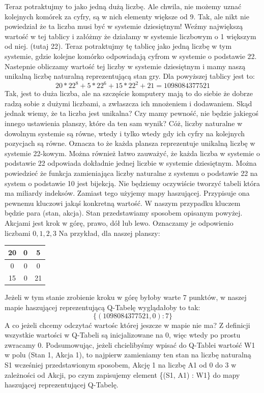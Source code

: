 \documentclass[a4paper,12pt]{article}
\begin{document}
Teraz potraktujmy to jako jedną dużą liczbę. Ale chwila, nie możemy uznać kolejnych komórek za cyfry, są w nich elementy większe od 9. Tak, ale nikt nie powiedział że ta liczba musi być w systemie dziesiętnym! Weźmy największą wartość w tej tablicy i załóżmy że działamy w systemie liczbowym o 1 większym od niej. (tutaj 22). Teraz potraktujmy tę tablicę jako jedną liczbę w tym systemie, gdzie kolejne komórko odpowiadają cyfrom w systemie o podstawie 22. Nastepnie obliczamy wartość tej liczby w systemie dziesiętnym i mamy naszą unikalną liczbę naturalną reprezentującą stan gry. Dla powyższej tablicy jest to:
\[20*22^8 + 5*22^6 + 15*22^2 + 21 = 1098084377521\]
Tak, jest to duża liczba, ale na szczęście komputery mają to do siebie że dobrze radzą sobie z dużymi liczbami, a zwłaszcza ich mnożeniem i dodawaniem.
\newline \newline Skąd jednak wiemy, że ta liczba jest unikalna? Czy mamy pewność, nie będzie jakiegoś innego ustawienia planszy, które da ten sam wynik? Cóż, liczby naturalne w dowolnym systemie są równe, wtedy i tylko wtedy gdy ich cyfry na kolejnych pozycjach są równe. Oznacza to że każda plansza reprezentuje unikalną liczbę w systemie 22-kowym. Można również łatwo zauważyć, że każda liczba w systemie o podstawie 22 odpowiada dokładnie jednej liczbie w systemie dziesiętnym. Można powiedzieć że funkcja zamieniająca liczby naturalne z systemu o podstawie 22 na system o podstawie 10 jest bijekcją.
\newline \newline Nie będziemy oczywiście tworzyć tabeli która ma miliardy indeksów. Zamiast tego użyjemy mapy haszującej. Przypisuje ona pewnemu kluczowi jakąś konkretną wartość. W naszym przypadku kluczem będzie para (stan, akcja). Stan przedstawiamy sposobem opisanym powyżej. Akcjami jest krok w górę, prawo, dół lub lewo. Oznaczamy je odpowienio liczbami \(0, 1, 2, 3\)
Na przykład, dla naszej planszy:
\begin{center}
\begin{tabular}{ |c|c|c| }
\hline
20 & 0 & 5 \\
\hline
0 & 0 & 0 \\
\hline
15 & 0 & 21 \\
\hline
\end{tabular}
\end{center} 
Jeżeli w tym stanie zrobienie kroku w górę byłoby warte 7 punktów, w naszej mapie haszującej reprezentującą Q-Tabelę wyglądałoby to tak:
\[\{ (1098084377521, 0) : 7 \}\]
A co jeżeli chcemy odczytać wartośc której jeszcze w mapie nie ma? Z definicji wszystkie wartości w Q-Tabeli są inicjalizowane na 0, więc wtedy po prostu zwracamy 0.
\newline \newline Podsumowując, jeżeli chcielibyśmy wpisać do Q-Tablei wartość W1 w polu (Stan 1, Akcja 1), to najpierw zamieniamy ten stan na liczbę naturalną S1 wcześniej przedstawionym sposobem, Akcję 1 na liczbę A1 od 0 do 3 w zależności od Akcji, po czym zapisujemy element \{(S1, A1) :  W1\} do mapy haszującej reprezentującej Q-Tabelę.
\end{document}
